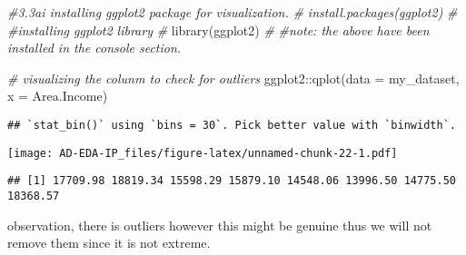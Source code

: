 \documentclass[
]{article}
\newenvironment{Shaded}{\begin{snugshade}}{\end{snugshade}}
\newcommand{\AttributeTok}[1]{\textcolor[rgb]{0.77,0.63,0.00}{#1}}
\newcommand{\CommentTok}[1]{\textcolor[rgb]{0.56,0.35,0.01}{\textit{#1}}}
\newcommand{\FloatTok}[1]{\textcolor[rgb]{0.00,0.00,0.81}{#1}}
\newcommand{\FunctionTok}[1]{\textcolor[rgb]{0.00,0.00,0.00}{#1}}
\newcommand{\NormalTok}[1]{#1}
\newcommand{\OtherTok}[1]{\textcolor[rgb]{0.56,0.35,0.01}{#1}}
\newcommand{\SpecialCharTok}[1]{\textcolor[rgb]{0.00,0.00,0.00}{#1}}
\newcommand{\StringTok}[1]{\textcolor[rgb]{0.31,0.60,0.02}{#1}}
\begin{document}
\begin{Shaded}
\begin{Highlighting}[]
\CommentTok{\#3.3ai installing ggplot2 package for visualization.}
\CommentTok{\# install.packages(\textquotesingle{}ggplot2\textquotesingle{})}
\CommentTok{\#}
\CommentTok{\#installing ggplot2 library}
\CommentTok{\#}
\FunctionTok{library}\NormalTok{(ggplot2)}
\CommentTok{\#}
\CommentTok{\#note: the above  have been installed in the console section.}
\end{Highlighting}
\end{Shaded}

\begin{Shaded}
\begin{Highlighting}[]
\CommentTok{\# visualizing the colunm to check for outliers}
\NormalTok{ggplot2}\SpecialCharTok{::}\FunctionTok{qplot}\NormalTok{(}\AttributeTok{data =}\NormalTok{ my\_dataset, }\AttributeTok{x =}\NormalTok{ Area.Income)}
\end{Highlighting}
\end{Shaded}

\begin{verbatim}
## `stat_bin()` using `bins = 30`. Pick better value with `binwidth`.
\end{verbatim}

\texttt{[image: AD-EDA-IP\_files/figure-latex/unnamed-chunk-22-1.pdf]}

\begin{Shaded}
\end{Shaded}

\begin{verbatim}
## [1] 17709.98 18819.34 15598.29 15879.10 14548.06 13996.50 14775.50 18368.57
\end{verbatim}

observation, there is outliers however this might be genuine thus we
will not remove them since it is not extreme.

\begin{Shaded}
\end{Shaded}
\end{document}
